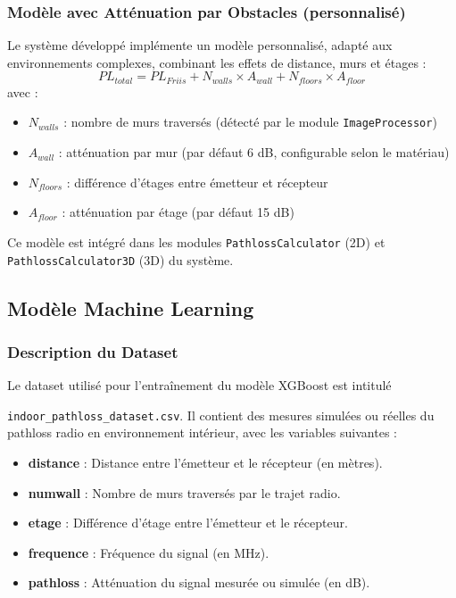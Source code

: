 \documentclass[12pt,a4paper]{article}
\begin{document}
\subsubsection{Modèle avec Atténuation par Obstacles (personnalisé)}
Le système développé implémente un modèle personnalisé, adapté aux environnements complexes, combinant les effets de distance, murs et étages :
\begin{equation}
    PL_{total} = PL_{Friis} + N_{walls} \times A_{wall} + N_{floors} \times A_{floor}
\end{equation}
avec :
\begin{itemize}
    \item $N_{walls}$ : nombre de murs traversés (détecté par le module \texttt{ImageProcessor})
    \item $A_{wall}$ : atténuation par mur (par défaut 6 dB, configurable selon le matériau)
    \item $N_{floors}$ : différence d’étages entre émetteur et récepteur
    \item $A_{floor}$ : atténuation par étage (par défaut 15 dB)
\end{itemize}

Ce modèle est intégré dans les modules \texttt{PathlossCalculator} (2D) et \texttt{PathlossCalculator3D} (3D) du système.

\subsection{Modèle Machine Learning}
\subsubsection{Description du Dataset}

Le dataset utilisé pour l'entraînement du modèle XGBoost est intitulé 

\texttt{indoor\_pathloss\_dataset.csv}. Il contient des mesures simulées ou réelles du pathloss radio en environnement intérieur, avec les variables suivantes :
\begin{itemize}
    \item \textbf{distance} : Distance entre l'émetteur et le récepteur (en mètres).
    \item \textbf{numwall} : Nombre de murs traversés par le trajet radio.
    \item \textbf{etage} : Différence d'étage entre l'émetteur et le récepteur.
    \item \textbf{frequence} : Fréquence du signal (en MHz).
    \item \textbf{pathloss} : Atténuation du signal mesurée ou simulée (en dB).
\end{itemize}
\end{document}
